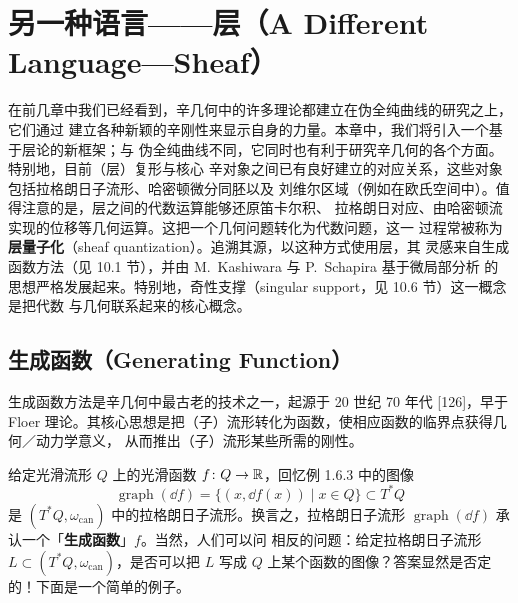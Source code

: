 \chapter{另一种语言——层（A Different Language—Sheaf）}

在前几章中我们已经看到，辛几何中的许多理论都建立在伪全纯曲线的研究之上，它们通过
建立各种新颖的辛刚性来显示自身的力量。本章中，我们将引入一个基于层论的新框架；与
伪全纯曲线不同，它同时也有利于研究辛几何的各个方面。特别地，目前（层）复形与核心
辛对象之间已有良好建立的对应关系，这些对象包括拉格朗日子流形、哈密顿微分同胚以及
刘维尔区域（例如在欧氏空间中）。值得注意的是，层之间的代数运算能够还原笛卡尔积、
拉格朗日对应、由哈密顿流实现的位移等几何运算。这把一个几何问题转化为代数问题，这一
过程常被称为\textbf{层量子化}（sheaf quantization）。追溯其源，以这种方式使用层，其
灵感来自生成函数方法（见 10.1 节），并由 M.~Kashiwara 与 P.~Schapira 基于微局部分析
的思想严格发展起来。特别地，奇性支撑（singular support，见 10.6 节）这一概念是把代数
与几何联系起来的核心概念。

\section{生成函数（Generating Function）}

生成函数方法是辛几何中最古老的技术之一，起源于 20 世纪 70 年代 [126]，早于 Floer
理论。其核心思想是把（子）流形转化为函数，使相应函数的临界点获得几何／动力学意义，
从而推出（子）流形某些所需的刚性。

给定光滑流形 $Q$ 上的光滑函数 $f\colon Q\to\mathbb{R}$，回忆例 1.6.3 中的图像
\begin{equation}\tag{10.1}
  \operatorname{graph}(\dd f)=\{(x,\dd f(x))\mid x\in Q\}\subset T^*Q
\end{equation}
是 $(T^*Q,\omega_{\mathrm{can}})$ 中的拉格朗日子流形。换言之，拉格朗日子流形
$\operatorname{graph}(\dd f)$ 承认一个「\textbf{生成函数}」$f$。当然，人们可以问
相反的问题：给定拉格朗日子流形 $L\subset(T^*Q,\omega_{\mathrm{can}})$，是否可以把
$L$ 写成 $Q$ 上某个函数的图像？答案显然是否定的！下面是一个简单的例子。

